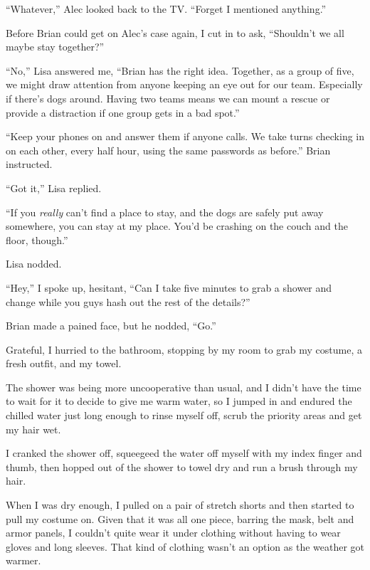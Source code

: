 ``Whatever,'' Alec looked back to the TV.  ``Forget I mentioned anything.''



Before Brian could get on Alec's case again, I cut in to ask, ``Shouldn't we all maybe stay together?''



``No,'' Lisa answered me, ``Brian has the right idea.  Together, as a group of five, we might draw attention from anyone keeping an eye out for our team.  Especially if there's dogs around.  Having two teams means we can mount a rescue or provide a distraction if one group gets in a bad spot.''



``Keep your phones on and answer them if anyone calls.  We take turns checking in on each other, every half hour, using the same passwords as before.'' Brian instructed.



``Got it,'' Lisa replied.



``If you \emph{really} can't find a place to stay, and the dogs are safely put away somewhere, you can stay at my place.  You'd be crashing on the couch and the floor, though.''



Lisa nodded.



``Hey,'' I spoke up, hesitant, ``Can I take five minutes to grab a shower and change while you guys hash out the rest of the details?''



Brian made a pained face, but he nodded, ``Go.''



Grateful, I hurried to the bathroom, stopping by my room to grab my costume, a fresh outfit, and my towel.



The shower was being more uncooperative than usual, and I didn't have the time to wait for it to decide to give me warm water, so I jumped in and endured the chilled water just long enough to rinse myself off, scrub the priority areas and get my hair wet.



I cranked the shower off, squeegeed the water off myself with my index finger and thumb, then hopped out of the shower to towel dry and run a brush through my hair.



When I was dry enough, I pulled on a pair of stretch shorts and then started to pull my costume on.  Given that it was all one piece, barring the mask, belt and armor panels, I couldn't quite wear it under clothing without having to wear gloves and long sleeves.  That kind of clothing wasn't an option as the weather got warmer.



